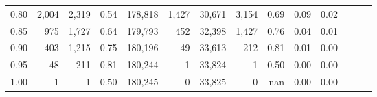 \begin{tabular}{rrrrrrrrrrrrrr}
0.80 &   2,004 &  2,319 &  0.54 &  178,818 &    1,427 &  30,671 &   3,154 &  0.69 &  0.09 &      0.02 \\
0.85 &     975 &  1,727 &  0.64 &  179,793 &      452 &  32,398 &   1,427 &  0.76 &  0.04 &      0.01 \\
0.90 &     403 &  1,215 &  0.75 &  180,196 &       49 &  33,613 &     212 &  0.81 &  0.01 &      0.00 \\
0.95 &      48 &    211 &  0.81 &  180,244 &        1 &  33,824 &       1 &  0.50 &  0.00 &      0.00 \\
1.00 &       1 &      1 &  0.50 &  180,245 &        0 &  33,825 &       0 &   nan &  0.00 &      0.00 \\
\bottomrule
\end{tabular}
